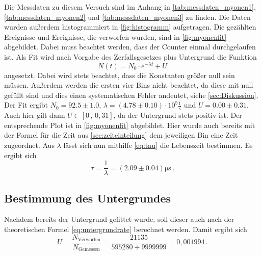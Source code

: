 Die Messdaten zu diesem Versuch sind im Anhang in \autoref{tab:messdaten_myonen1}, \autoref{tab:messdaten_myonen2} und \autoref{tab:messdaten_myonen3} zu finden.
Die Daten wurden außerdem histogrammiert in \autoref{fig:histogramm} aufgetragen.
Die gezählten Ereignisse und Ereignisse, die verworfen wurden, sind in \autoref{fig:myonenfit} abgebildet.
Dabei muss beachtet werden, dass der Counter einmal durchgelaufen ist.
Als Fit wird nach Vorgabe des Zerfallsgesetzes plus Untergrund die Funktion
\begin{equation*}
    N(t) = N_0 \cdot e^{- \lambda t} + U
\end{equation*} 
angesetzt.
Dabei wird stets beachtet, dass die Konstanten größer null sein müssen.
Außerdem werden die ersten vier Bins nicht beachtet, da diese mit null gefüllt sind und dies einen systematischen Fehler andeutet, siehe \autoref{sec:Diskussion}.
Der Fit ergibt $N_0 = 92.5 \pm 1.0$, $\lambda = (4.78 \pm 0.10) \cdot 10^5 \frac{1}{\unit{\second}}$ und $U = 0.00 \pm 0.31$.
Auch hier gilt dann $U \in [0 \, , \, 0,31]$, da der Untergrund stets positiv ist.
Der entsprechende Plot ist in \autoref{fig:myonenfit} abgebildet.
Hier wurde auch bereits mit der Formel für die Zeit aus \autoref{sec:zeiteinteilung} dem jeweiligen Bin eine Zeit zugeordnet.
Aus $\lambda$ lässt sich nun mithilfe \autoref{eq:tau} die Lebenszeit bestimmen.
Es ergibt sich
\begin{equation}
    \tau = \frac{1}{\lambda} = (2.09\pm 0.04) \unit{\micro\second} \, .
\end{equation}

\subsection{Bestimmung des Untergrundes} \label{sec:untergrund_ausw}

Nachdem bereits der Untergrund gefittet wurde, soll dieser auch nach der theoretischen Formel \autoref{eq:untergrundrate} berechnet werden.
Damit ergibt sich
\begin{equation*}
    U = \frac{N_\text{Verworfen}}{N_\text{Gemessen}} = \frac{21135}{595280 + 9999999} = 0,001994 \, .
\end{equation*} 
